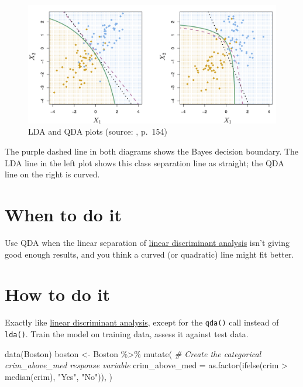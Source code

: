 \documentclass[
]{book}
\newenvironment{Shaded}{\begin{snugshade}}{\end{snugshade}}
\newcommand{\AttributeTok}[1]{\textcolor[rgb]{0.77,0.63,0.00}{#1}}
\newcommand{\CommentTok}[1]{\textcolor[rgb]{0.56,0.35,0.01}{\textit{#1}}}
\newcommand{\FunctionTok}[1]{\textcolor[rgb]{0.00,0.00,0.00}{#1}}
\newcommand{\NormalTok}[1]{#1}
\newcommand{\OtherTok}[1]{\textcolor[rgb]{0.56,0.35,0.01}{#1}}
\newcommand{\SpecialCharTok}[1]{\textcolor[rgb]{0.00,0.00,0.00}{#1}}
\newcommand{\StringTok}[1]{\textcolor[rgb]{0.31,0.60,0.02}{#1}}
\begin{document}
\begin{figure}
\centering
\includegraphics{images/4_9.png}
\caption{\label{fig:img-slr49}LDA and QDA plots (source: \citet{ISLR}, p.~154)}
\end{figure}

The purple dashed line in both diagrams shows the Bayes decision boundary. The LDA line in the left plot shows this class separation line as straight; the QDA line on the right is curved.

\hypertarget{when-to-do-it-4}{%
\section{When to do it}\label{when-to-do-it-4}}

Use QDA when the linear separation of \protect\hyperlink{linear-discriminant-analysis}{linear discriminant analysis} isn't giving good enough results, and you think a curved (or quadratic) line might fit better.

\hypertarget{how-to-do-it-4}{%
\section{How to do it}\label{how-to-do-it-4}}

Exactly like \protect\hyperlink{linear-discriminant-analysis}{linear discriminant analysis}, except for the \texttt{qda()} call instead of \texttt{lda()}. Train the model on training data, assess it against test data.

\begin{Shaded}
\begin{Highlighting}[]
\FunctionTok{data}\NormalTok{(Boston)}
\NormalTok{boston }\OtherTok{\textless{}{-}}\NormalTok{ Boston }\SpecialCharTok{\%\textgreater{}\%}
  \FunctionTok{mutate}\NormalTok{(}
    \CommentTok{\# Create the categorical crim\_above\_med response variable}
    \AttributeTok{crim\_above\_med =} \FunctionTok{as.factor}\NormalTok{(}\FunctionTok{ifelse}\NormalTok{(crim }\SpecialCharTok{\textgreater{}} \FunctionTok{median}\NormalTok{(crim), }\StringTok{"Yes"}\NormalTok{, }\StringTok{"No"}\NormalTok{)),}
\NormalTok{  )}
\end{Highlighting}
\end{Shaded}
\end{document}
